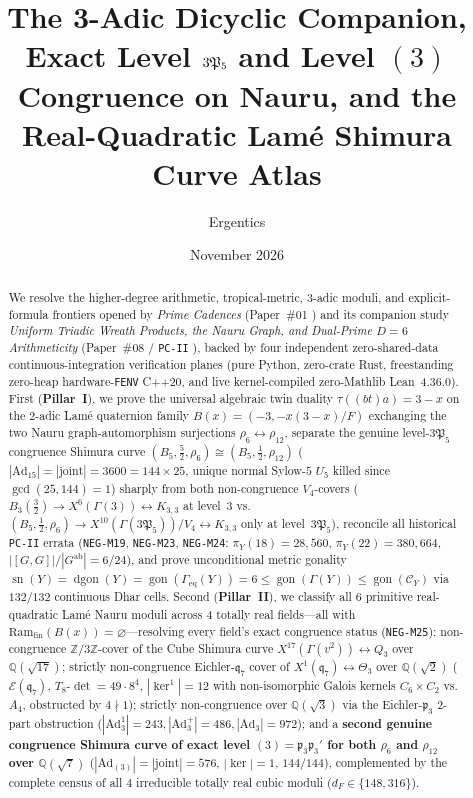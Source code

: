\documentclass[11pt]{amsart}
\title[3-Adic \texorpdfstring{$\Dic_6$}{Dic6}, Nauru Congruence \& Real-Quadratic Atlas]{The 3-Adic Dicyclic Companion, Exact Level \texorpdfstring{$3\frP_5$}{3P5} and Level \texorpdfstring{$(3)$}{(3)} Congruence on Nauru, and the Real-Quadratic Lam\'e Shimura Curve Atlas}
\author{Ergentics}
\date{November 2026}
\numberwithin{equation}{section}
\theoremstyle{plain}
\theoremstyle{definition}\newtheorem{definition}[theorem]{Definition}
\theoremstyle{remark}\newtheorem{remark}[theorem]{Remark}
\newcommand{\Q}{\mathbb{Q}}
\newcommand{\Z}{\mathbb{Z}}
\newcommand{\calE}{\mathcal{E}}
\newcommand{\calC}{\mathcal{C}}
\newcommand{\frP}{\mathfrak{P}}
\newcommand{\frp}{\mathfrak{p}}
\newcommand{\frq}{\mathfrak{q}}
\newcommand{\Ad}{\mathrm{Ad}}
\newcommand{\Ram}{\mathrm{Ram}}
\newcommand{\gon}{\operatorname{gon}}
\newcommand{\dgon}{\operatorname{dgon}}
\newcommand{\sn}{\operatorname{sn}}
\begin{document}
\begin{abstract}
We resolve the higher-degree arithmetic, tropical-metric, $3$-adic moduli, and explicit-formula frontiers opened by \emph{Prime Cadences} (Paper~\#01 \cite{ergentics2026pc}) and its companion study \emph{Uniform Triadic Wreath Products, the Nauru Graph, and Dual-Prime $D=6$ Arithmeticity} (Paper~\#08 / \texttt{PC-II} \cite{ergentics2026pc2}), backed by four independent zero-shared-data continuous-integration verification planes (pure Python, zero-crate Rust, freestanding zero-heap hardware-\texttt{FENV} C++20, and live kernel-compiled zero-Mathlib Lean~4.36.0).
First (\textbf{Pillar~I}), we prove the universal algebraic twin duality $\tau((bt)a) = 3 - x$ on the $2$-adic Lam\'e quaternion family $B(x) = (-3, -x(3-x)/F)$ exchanging the two Nauru graph-automorphism surjections $\rho_6 \leftrightarrow \rho_{12}$, separate the genuine level-$3\frP_5$ congruence Shimura curve $(B_5, \frac{5}{2}, \rho_6) \cong (B_5, \frac{1}{2}, \rho_{12})$ ($|\Ad_{15}| = |\mathrm{joint}| = 3600 = 144\times 25$, unique normal Sylow-$5$ $U_5$ killed since $\gcd(25,144)=1$) sharply from both non-congruence $V_4$-covers ($B_3(\frac{3}{2}) \to X^6(\Gamma(3)) \leftrightarrow K_{3,3}$ at level~$3$ vs.\ $(B_5, \frac{1}{2}, \rho_6) \to X^{10}(\Gamma(3\frP_5))/V_4 \leftrightarrow K_{3,3}$ only at level~$3\frP_5$), reconcile all historical \texttt{PC-II} errata (\texttt{NEG-M19}, \texttt{NEG-M23}, \texttt{NEG-M24}: $\pi_Y(18)=28{,}560$, $\pi_Y(22)=380{,}664$, $|[G,G]|/|G^{\mathrm{ab}}|=6/24$), and prove unconditional metric gonality $\sn(Y) = \dgon(Y) = \gon(\Gamma_{\mathrm{eq}}(Y)) = 6 \le \gon(\Gamma(Y)) \le \gon(\calC_Y)$ via $132/132$ continuous Dhar cells.
Second (\textbf{Pillar~II}), we classify all $6$ primitive real-quadratic Lam\'e Nauru moduli across $4$ totally real fields---all with $\Ram_{\mathrm{fin}}(B(x)) = \varnothing$---resolving every field's exact congruence status (\texttt{NEG-M25}): non-congruence $\Z/3\Z$-cover of the Cube Shimura curve $X^{17}(\Gamma(v^2)) \leftrightarrow Q_3$ over $\Q(\sqrt{17})$; strictly non-congruence Eichler-$\frq_7$ cover of $X^1(\frq_7) \leftrightarrow \Theta_3$ over $\Q(\sqrt{2})$ ($\calE(\frq_7)$, $T_8\text{-}\det = 49\cdot 8^4$, $|\ker^1|=12$ with non-isomorphic Galois kernels $C_6\times C_2$ vs.\ $A_4$, obstructed by $4\nmid 1$); strictly non-congruence over $\Q(\sqrt{3})$ via the Eichler-$\frp_3$ $2$-part obstruction ($|\Ad_3^1|=243, |\Ad_3^+|=486, |\Ad_3|=972$); and a \textbf{second genuine congruence Shimura curve of exact level $(3) = \frp_3\frp_3'$ for both $\rho_6$ and $\rho_{12}$ over $\Q(\sqrt{7})$} ($|\Ad_{(3)}| = |\mathrm{joint}| = 576$, $|\ker| = 1$, $144/144$), complemented by the complete census of all $4$ irreducible totally real cubic moduli ($d_F \in \{148, 316\}$).

\end{abstract}
\end{document}
